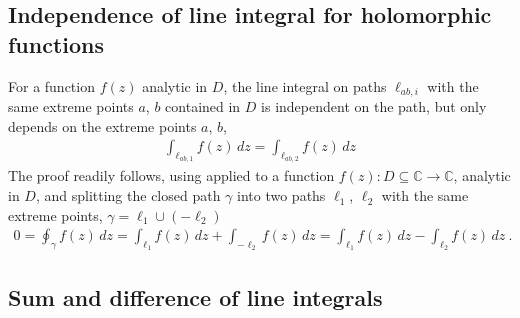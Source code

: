 \documentclass[letterpaper,10pt,english]{jupyterBook}
\begin{document}
\subsection{Independence of line integral for holomorphic functions}
\label{\detokenize{ch/complex/analysis:independence-of-line-integral-for-holomorphic-functions}}\label{\detokenize{ch/complex/analysis:complex-analysis-useful-int-path-independence}}
\sphinxAtStartPar
For a function \(f(z)\) analytic in \(D\), the line integral on paths \(\ell_{ab,i}\) with the same extreme points \(a\), \(b\) contained in \(D\) is independent on the path, but only depends on the extreme points \(a\), \(b\),
\begin{equation*}
\begin{split}\int_{\ell_{ab,1}} f(z) \, dz = \int_{\ell_{ab,2}} f(z) \, dz\end{split}
\end{equation*}
\sphinxAtStartPar
The proof readily follows, using {\hyperref[\detokenize{ch/complex/analysis:complex-analysis-holo-fun-cauchy-thm}]{}} applied to a function \(f(z): D \subseteq \mathbb{C} \rightarrow \mathbb{C}\), analytic in \(D\), and splitting the closed path \(\gamma\) into two paths \(\ell_1\), \(\ell_2\) with the same extreme points, \(\gamma = \ell_1 \cup (- \ell_2)\)
\begin{equation*}
\begin{split}0 = \oint_{\gamma} f(z) \, dz = \int_{\ell_1} f(z) \, dz + \int_{-\ell_2} f(z) \, dz = \int_{\ell_1} f(z) \, dz - \int_{\ell_2} f(z) \, dz \ .\end{split}
\end{equation*}

\subsection{Sum and difference of line integrals}
\label{\detokenize{ch/complex/analysis:sum-and-difference-of-line-integrals}}\label{\detokenize{ch/complex/analysis:complex-analysis-useful-int-path-independence-sum}}
\end{document}
